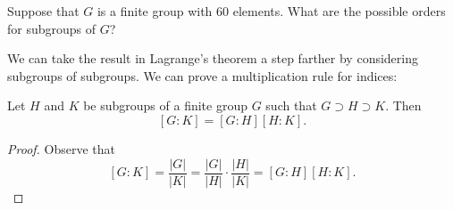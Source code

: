 \begin{exercise}{}
Suppose that $G$ is a finite group with 60 elements.  What are the possible orders for subgroups of $G$?
\end{exercise}


We can take the result in Lagrange's theorem a step farther by considering  subgroups of subgroups. We can prove a multiplication rule for indices:

\begin{thm}\label{cosets_theorem_8}
Let $H$ and $K$ be subgroups of a finite group $G$ such that $G \supset H \supset K$.  Then 
\[
[G:K] = [G:H][H:K].
\]
\end{thm}
 
\begin{proof}
Observe that
\[
[G:K] = \frac{|G|}{|K|} = \frac{|G|}{|H|} \cdot
\frac{|H|}{|K|} = [G:H][H:K].
\]
\end{proof}

\histhead

